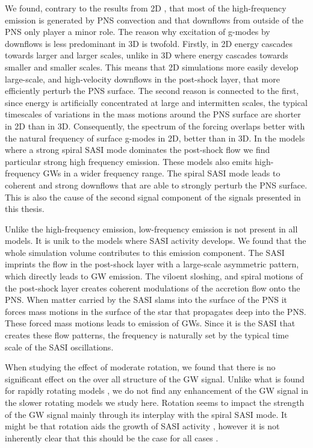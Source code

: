 We found, contrary to the results from 2D \citep{marek_08,murphy_09,mueller_13}, that most of the high-frequency emission is 
generated by PNS convection and that downflows from outside of the PNS only player a minor role. The reason why excitation 
of g-modes by downflows is less predominant in 3D is twofold. Firstly, in 2D energy cascades towards larger and larger scales, unlike
in 3D where energy cascades towards smaller and smaller scales. This means that 2D simulations more easily develop large-scale, and
high-velocity downflows in the post-shock layer, that more efficiently perturb the PNS surface. The second reason is connected to the first, since
energy is artificially concentrated at large and intermitten scales, the typical timescales of variations in the mass motions around 
the PNS surface are shorter in 2D than in 3D. Consequently, the spectrum of the forcing overlaps better with the natural frequency
of surface g-modes in 2D, better than in 3D.
In the models where a strong spiral SASI mode dominates the post-shock flow we find particular strong high frequency emission. These models
also emits high-frequency GWs in a wider frequency range. The spiral SASI mode leads to coherent and strong downflows that are able to
strongly perturb the PNS surface. This is also the cause of the second signal component of the signals presented in this thesis.  

Unlike the high-frequency emission, low-frequency emission \citep{kuroda_16} 
is not present in all models. It is unik to the models where SASI activity develops.
We found that the whole simulation volume contributes to this emission component. The SASI imprints the flow in the post-shock layer with a
large-scale asymmetric pattern, which directly leads to GW emission. The viloent sloshing, and spiral motions of the post-shock layer
creates coherent modulations of the accretion flow onto the PNS. When matter carried by the SASI slams into the surface of the PNS
it forces mass motions in the surface of the star that propagates deep into the PNS. These forced mass motions leads to emission of GWs.
Since it is the SASI that creates these flow patterns, the frequency is naturally set by the typical time scale of the SASI oscillations.

When studying the effect of moderate rotation, we found that there is no significant effect on the over all structure of the
GW signal. Unlike what is found for rapidly rotating models \citep{rampp_98,shibata_05,ott_05,kuroda_14,takiwaki_16}, 
we do not find any enhancement of the GW signal in the slower rotating models we study here. Rotation seems to impact the 
strength of the GW signal mainly through its interplay with the spiral SASI mode. It might be that rotation aids
the growth of SASI activity \citep{yamasaki_08,blondin_17}, however it is not inherently clear that this should be the case
for all cases \citep{kazeroni_17}.

